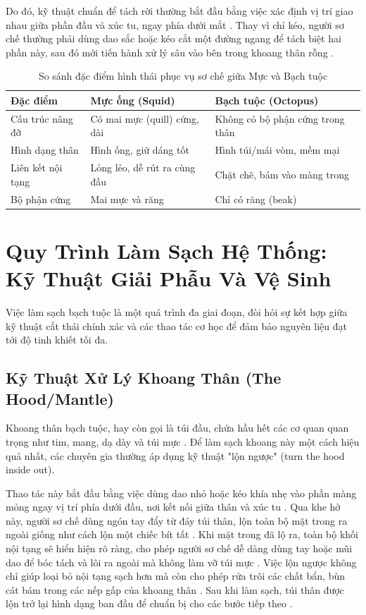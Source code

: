 \documentclass[12pt,a4paper]{report}
\begin{document}
Do đó, kỹ thuật chuẩn để tách rời thường bắt đầu bằng việc xác định vị trí giao nhau giữa phần đầu và xúc tu, ngay phía dưới mắt \cite{ref1}. Thay vì chỉ kéo, người sơ chế thường phải dùng dao sắc hoặc kéo cắt một đường ngang để tách biệt hai phần này, sau đó mới tiến hành xử lý sâu vào bên trong khoang thân rỗng \cite{ref4}.

\begin{table}[H]
\centering
\caption{So sánh đặc điểm hình thái phục vụ sơ chế giữa Mực và Bạch tuộc}
\begin{tabular}{p{3.5cm} p{5.5cm} p{5.5cm}}
\toprule
\textbf{Đặc điểm} & \textbf{Mực ống (Squid)} & \textbf{Bạch tuộc (Octopus)} \\
\midrule
Cấu trúc nâng đỡ & Có mai mực (quill) cứng, dài \cite{ref5} & Không có bộ phận cứng trong thân \cite{ref7} \\
Hình dạng thân & Hình ống, giữ dáng tốt \cite{ref5} & Hình túi/mái vòm, mềm mại \cite{ref7} \\
Liên kết nội tạng & Lỏng lẻo, dễ rút ra cùng đầu \cite{ref1} & Chặt chẽ, bám vào màng trong \cite{ref12} \\
Bộ phận cứng & Mai mực và răng \cite{ref7} & Chỉ có răng (beak) \cite{ref7} \\
\bottomrule
\end{tabular}
\end{table}

\section{Quy Trình Làm Sạch Hệ Thống: Kỹ Thuật Giải Phẫu Và Vệ Sinh}

Việc làm sạch bạch tuộc là một quá trình đa giai đoạn, đòi hỏi sự kết hợp giữa kỹ thuật cắt thái chính xác và các thao tác cơ học để đảm bảo nguyên liệu đạt tới độ tinh khiết tối đa.

\subsection{Kỹ Thuật Xử Lý Khoang Thân (The Hood/Mantle)}

Khoang thân bạch tuộc, hay còn gọi là túi đầu, chứa hầu hết các cơ quan quan trọng như tim, mang, dạ dày và túi mực \cite{ref13}. Để làm sạch khoang này một cách hiệu quả nhất, các chuyên gia thường áp dụng kỹ thuật "lộn ngược" (turn the hood inside out).

Thao tác này bắt đầu bằng việc dùng dao nhỏ hoặc kéo khía nhẹ vào phần màng mỏng ngay vị trí phía dưới đầu, nơi kết nối giữa thân và xúc tu \cite{ref2}. Qua khe hở này, người sơ chế dùng ngón tay đẩy từ đáy túi thân, lộn toàn bộ mặt trong ra ngoài giống như cách lộn một chiếc bít tất \cite{ref2}. Khi mặt trong đã lộ ra, toàn bộ khối nội tạng sẽ hiển hiện rõ ràng, cho phép người sơ chế dễ dàng dùng tay hoặc mũi dao để bóc tách và lôi ra ngoài mà không làm vỡ túi mực \cite{ref1}. Việc lộn ngược không chỉ giúp loại bỏ nội tạng sạch hơn mà còn cho phép rửa trôi các chất bẩn, bùn cát bám trong các nếp gấp của khoang thân \cite{ref12}. Sau khi làm sạch, túi thân được lộn trở lại hình dạng ban đầu để chuẩn bị cho các bước tiếp theo \cite{ref17}.
\end{document}
